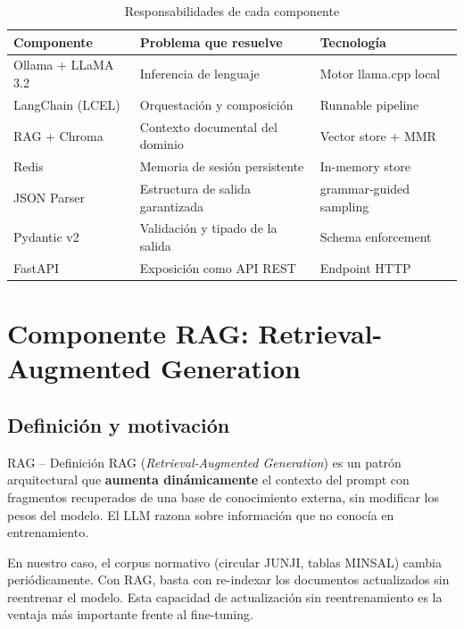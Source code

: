 \documentclass[12pt,a4paper]{article}
\begin{document}
\begin{table}[H]
\centering
\caption{Responsabilidades de cada componente}
\label{tab:componentes}
\begin{tabular}{lll}
\toprule
\textbf{Componente} & \textbf{Problema que resuelve} & \textbf{Tecnología} \\
\midrule
Ollama + LLaMA 3.2 & Inferencia de lenguaje & Motor llama.cpp local \\
LangChain (LCEL)   & Orquestación y composición & Runnable pipeline \\
RAG + Chroma       & Contexto documental del dominio & Vector store + MMR \\
Redis              & Memoria de sesión persistente & In-memory store \\
JSON Parser        & Estructura de salida garantizada & grammar-guided sampling \\
Pydantic v2        & Validación y tipado de la salida & Schema enforcement \\
FastAPI            & Exposición como API REST & Endpoint HTTP \\
\bottomrule
\end{tabular}
\end{table}

\section{Componente RAG: Retrieval-Augmented Generation}
\label{sec:rag}

\subsection{Definición y motivación}

\begin{conceptbox}{RAG -- Definición}
RAG (\textit{Retrieval-Augmented Generation}) es un patrón arquitectural
que \textbf{aumenta dinámicamente} el contexto del prompt con fragmentos
recuperados de una base de conocimiento externa, sin modificar los pesos
del modelo. El LLM razona sobre información que no conocía en entrenamiento.
\end{conceptbox}

En nuestro caso, el corpus normativo (circular JUNJI, tablas MINSAL) cambia
periódicamente. Con RAG, basta con re-indexar los documentos actualizados sin
reentrenar el modelo. Esta capacidad de actualización sin reentrenamiento es
la ventaja más importante frente al fine-tuning.
\end{document}
